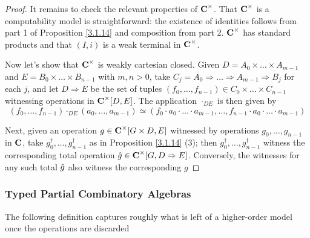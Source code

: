 \documentclass[11pt]{article}
\begin{document}
\begin{proof}
It remains to check the relevant properties of \(\operatorname{\textbf{C}}^\times\). That \(\operatorname{\textbf{C}}^\times\) is a computability model is
straightforward: the existence of identities follows from part 1 of Proposition \ref{3.1.14}
and composition from part 2. \(\operatorname{\textbf{C}}^\times\) has standard products and that \((I,i)\) is a weak terminal
in \(\operatorname{\textbf{C}}^\times\).

Now let's show that \(\operatorname{\textbf{C}}^\times\) is weakly cartesian closed. Given \(D=A_0\times\dots\times A_{m-1}\)
and \(E=B_0\times\dots\times B_{n-1}\) with \(m,n>0\), take \(C_j=A_0\Rightarrow\dots\Rightarrow A_{m-1}\Rightarrow B_j\) for each \(j\), and
let \(D\Rightarrow E\) be the set of tuples \((f_0,\dots,f_{n-1})\in C_0\times\dots\times C_{n-1}\) witnessing operations
in \(\operatorname{\textbf{C}}^\times[D,E]\). The application \(\cdot_{DE}\) is then given by
\begin{equation*}
(f_0,\dots,f_{n-1})\cdot_{DE}(a_0,\dots,a_{m-1})\simeq(f_0\cdot a_0\cdot\dots\cdot a_{m-1},\dots,f_{n-1}\cdot a_0\cdot\dots\cdot a_{m-1})
\end{equation*}

Next, given an operation \(g\in\operatorname{\textbf{C}}^\times[G\times D,E]\) witnessed by operations \(g_0,\dots,g_{n-1}\) in \(\operatorname{\textbf{C}}\),
take \(g_0^\dagger,\dots,g_{n-1}^\dagger\) as in Proposition \ref{3.1.14} (3); then \(g_0^\dagger,\dots,g_{n-1}^\dagger\) witness
the corresponding total operation \(\hat{g}\in\operatorname{\textbf{C}}^\times[G,D\Rightarrow E]\). Conversely, the witnesses for any such
total \(\hat{g}\) also witness the corresponding \(g\)
\end{proof}
\subsubsection{Typed Partial Combinatory Algebras}
\label{sec:orgfcc1831}
The following definition captures roughly what is left of a higher-order model once the
operations are discarded
\end{document}
